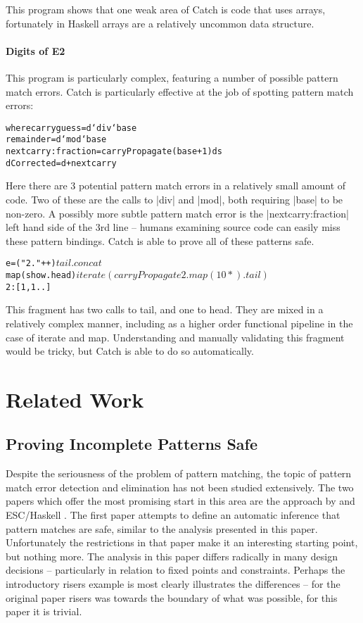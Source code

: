 \documentclass[preprint]{sigplanconf}
\newcommand{\C}[1]{\textsf{#1}}
\newenvironment{code}{\begin{alltt}\small}{\end{alltt}}
\begin{document}
This program shows that one weak area of Catch is code that uses arrays, fortunately in Haskell arrays are a relatively uncommon data structure.

\paragraph{Digits of E2}

This program is particularly complex, featuring a number of possible pattern match errors. Catch is particularly effective at the job of spotting pattern match errors:

\begin{code}
  where  carryguess = d `div` base
         remainder = d `mod` base
         nextcarry:fraction = carryPropagate (base+1) ds
         dCorrected = d + nextcarry
\end{code}

Here there are 3 potential pattern match errors in a relatively small amount of code. Two of these are the calls to |div| and |mod|, both requiring |base| to be non-zero. A possibly more subtle pattern match error is the |nextcarry:fraction| left hand side of the 3rd line -- humans examining source code can easily miss these pattern bindings. Catch is able to prove all of these patterns safe.

\begin{code}
e =  ("2."++) $
     tail . concat $
     map (show.head) $
     iterate (carryPropagate 2 . map (10*) . tail) $
     2:[1,1..]
\end{code}

This fragment has two calls to \C{tail}, and one to \C{head}. They are mixed in a relatively complex manner, including as a higher order functional pipeline in the case of \C{iterate} and \C{map}. Understanding and manually validating this fragment would be tricky, but Catch is able to do so automatically.


\section{Related Work}
\label{sec:related}

\subsection{Proving Incomplete Patterns Safe}

Despite the seriousness of the problem of pattern matching, the topic of pattern match error detection and elimination has not been studied extensively. The two papers which offer the most promising start in this area are the approach by \cite{me:catch_tfp} and ESC/Haskell \citep{esc_haskell}. The first paper attempts to define an automatic inference that pattern matches are safe, similar to the analysis presented in this paper. Unfortunately the restrictions in that paper make it an interesting starting point, but nothing more. The analysis in this paper differs radically in many design decisions -- particularly in relation to fixed points and constraints. Perhaps the introductory risers example is most clearly illustrates the differences -- for the original paper risers was towards the boundary of what was possible, for this paper it is trivial.
\end{document}
